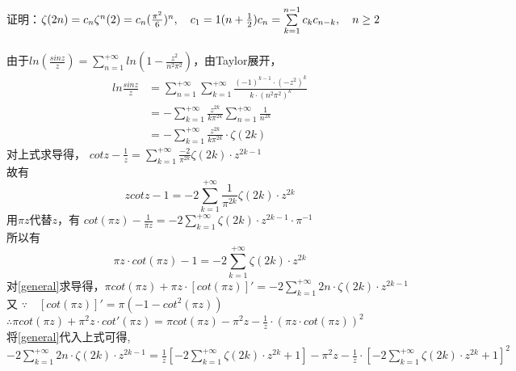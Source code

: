 \documentclass[18pt]{article}
\begin{document}
\section{}
证明：$\zeta(2n)=c_{n}\zeta^{n}(2)=c_{n}(\frac{\pi^2}{6})^{n},\quad c_{1}=1\\
(n+\frac{1}{2})c_{n}=\sum\limits_{k=1}^{n-1}c_{k}c_{n-k},\quad n \geq 2$\\
\\
由于$ln(\frac{sinz}{z})=\sum\limits_{n=1}^{+\infty}ln(1-\frac{z^2}{n^2 \pi^2})$，由Taylor展开，
\begin{equation}
\begin{split}
	ln\frac{sinz}{z} &=\sum\limits_{n=1}^{+\infty} \sum\limits_{k=1}^{+\infty} \frac{(-1)^{k-1} \cdot (-z^2)^k}{k \cdot (n^2 \pi^2)^k}\\
					 &=-\sum\limits_{k=1}^{+\infty} \frac{z^{2k}}{k \pi^{2k}} \sum\limits_{n=1}^{+\infty} \frac{1}{n^{2k}}\\
					 &=-\sum\limits_{k=1}^{+\infty} \frac{z^{2k}}{k \pi^{2k}} \cdot \zeta(2k) \label{basic}
\end{split}
\end{equation}
对上式求导得，
$cotz-\frac{1}{z}=\sum\limits_{k=1}^{+\infty}\frac{-2}{\pi^{2k}}\zeta(2k)\cdot z^{2k-1}$\\
故有\begin{equation}
	zcotz-1=-2\sum\limits_{k=1}^{+\infty}\frac{1}{\pi^{2k}}\zeta(2k) \cdot z^{2k} \label{use_in_3}
\end{equation}
用$\pi z$代替$z$，有
$cot(\pi z)-\frac{1}{\pi z}=-2 \sum\limits_{k=1}^{+\infty}\zeta(2k)\cdot z^{2k-1} \cdot \pi^{-1}$\\
所以有
\begin{equation}
	\pi z \cdot cot(\pi z)-1=-2 \sum\limits_{k=1}^{+\infty}\zeta(2k) \cdot z^{2k}\label{general}
\end{equation}
对\eqref{general}求导得，$\pi cot(\pi z)+\pi z \cdot [cot(\pi z)]'=-2\sum\limits_{k=1}^{+\infty} 2n \cdot \zeta(2k) \cdot z^{2k-1}$ \\
又 $\because \quad [cot(\pi z)]'=\pi(-1-cot^2(\pi z))$ \\
$\therefore \pi cot(\pi z)+\pi^2 z \cdot cot'(\pi z)= \pi cot(\pi z)-\pi^2 z-\frac{1}{z} \cdot (\pi z \cdot cot(\pi z))^2$\\
将\eqref{general}代入上式可得,\\
$-2\sum\limits_{k=1}^{+\infty} 2n \cdot \zeta(2k) \cdot z^{2k-1}=\frac{1}{z} [-2\sum\limits_{k=1}^{+\infty}\zeta(2k) \cdot z^{2k}+1]-\pi^2 z-\frac{1}{z} \cdot [-2\sum\limits_{k=1}^{+\infty}\zeta(2k) \cdot z^{2k}+1]^2$\\
\end{document}

